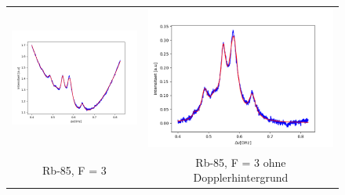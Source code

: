 \documentclass[a4paper,parskip]{scrartcl}
\begin{document}
\begin{figure}[p]
\begin{tabular}{cc}
    \includegraphics[scale = 0.45]{./saturation/peak2/fit.png}  &  \includegraphics[scale = 0.45]{./saturation/peak2/gaussCorrected.png}  \\
    {\footnotesize Rb-85, F = 3} & {\footnotesize Rb-85, F = 3 ohne Dopplerhintergrund}  \\

\end{tabular}
\end{figure}
\end{document}
